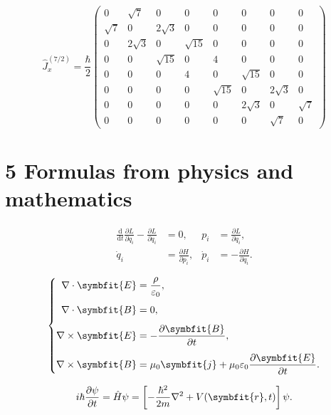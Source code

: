 \documentclass[a4paper,10pt]{article}
\begin{document}
\[
\hat J_x^{(7/2)}=\frac{\hbar}{2}
\begin{pmatrix}
0 & \sqrt{7} & 0 & 0 & 0 & 0 & 0 & 0 \\
\sqrt{7} & 0 & 2\sqrt{3} & 0 & 0 & 0 & 0 & 0 \\
0 & 2\sqrt{3} & 0 & \sqrt{15} & 0 & 0 & 0 & 0 \\
0 & 0 & \sqrt{15} & 0 & 4 & 0 & 0 & 0 \\
0 & 0 & 0 & 4 & 0 & \sqrt{15} & 0 & 0 \\
0 & 0 & 0 & 0 & \sqrt{15} & 0 & 2\sqrt{3} & 0 \\
0 & 0 & 0 & 0 & 0 & 2\sqrt{3} & 0 & \sqrt{7} \\
0 & 0 & 0 & 0 & 0 & 0 & \sqrt{7} & 0
\end{pmatrix}
\]


\clearpage
\section*{5 Formulas from physics and mathematics}

\[
\begin{aligned}
\frac{\mathrm d}{\mathrm dt}\frac{\partial L}{\partial\dot q_i}
 -\frac{\partial L}{\partial q_i}&=0,
 & p_i&=\frac{\partial L}{\partial\dot q_i},\\[4pt]
\dot q_i&=\frac{\partial H}{\partial p_i},
 & \dot p_i&=-\frac{\partial H}{\partial q_i}.
\end{aligned}
\]

\[
\left\{
\begin{aligned}
\nabla\cdot\symbfit{E}&=\frac{\rho}{\varepsilon_0},\\[4pt]
\nabla\cdot\symbfit{B}&=0,\\[4pt]
\nabla\times\symbfit{E}&=-\frac{\partial\symbfit{B}}{\partial t},\\[4pt]
\nabla\times\symbfit{B}&=\mu_0\symbfit{j}
  +\mu_0\varepsilon_0\frac{\partial\symbfit{E}}{\partial t}.
\end{aligned}
\right.
\]

\[
i\hbar\frac{\partial\psi}{\partial t}
 =\hat H\psi
 =\left[-\frac{\hbar^2}{2m}\nabla^2+V(\symbfit{r},t)\right]\psi.
\]
\end{document}
